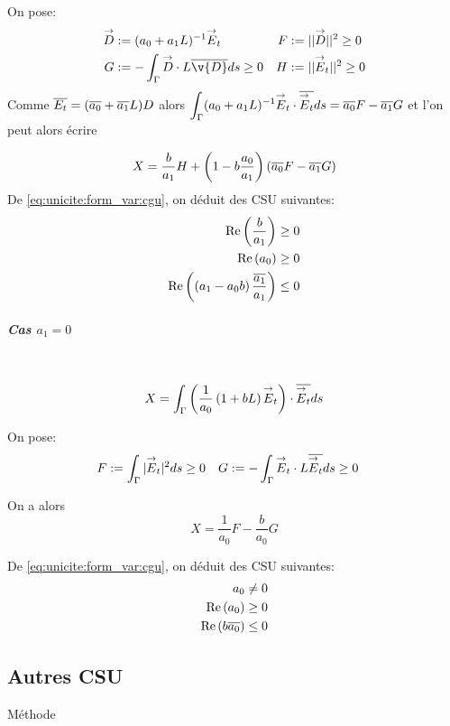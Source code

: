 					On pose:
					\begin{align*}
						\vect D &:= (a_0 + a_1 L)^{-1}\vE_t & F&:= || \vect D || ^2 \ge 0  \\
						G&:= -\int_\Gamma \vect D \cdot L\conj{\v{D}} ds \ge 0 & H &:= || \vE_t || ^2 \ge 0
					\end{align*}
					Comme \({\overline{E_t}} = ({\overline{a_0}} + {\overline{a_1}}L)D\) alors \(\displaystyle\int_\Gamma (a_0 +a_1 L) ^{-1}{\overset{\rightarrow}{E}}_t\cdot {\overline{{\overset{\rightarrow}{E}}_t}} ds = {\overline{a_0}} F - {\overline{a_1}} G\) et l'on peut alors écrire

					\begin{equation}
						\label{eq:unicite:form_var:decomp_cgu_ci1_a1}
						X = \dfrac{b}{a_1}H   + \left(1-b\dfrac{a_0}{a_1}\right)\left({\overline{a_0}} F - {\overline{a_1}} G\right)
					\end{equation}
					De \eqref{eq:unicite:form_var:cgu}, on déduit des CSU suivantes:
					\begin{align}
						\operatorname{Re}\left(\dfrac{b}{a_1}\right) \ge 0 \\
						\operatorname{Re}\left(a_0\right) \ge 0 \\
						\operatorname{Re}\left(\left(a_1-a_0 b\right)\dfrac{{\overline{a_1}}}{a_1}\right) \le 0
					\end{align}

				\subparagraph{Cas \(a_1=0\)}
					~
					\[
						X = \int_\Gamma \left( \dfrac{1}{a_0}\left(1+bL\right){\overset{\rightarrow}{E}}_t\right) \cdot {\overline{{\overset{\rightarrow}{E}}_t}} ds
					\]

					On pose:
					\begin{align*}
						F&:= \int_\Gamma | {\overset{\rightarrow}{E}}_t | ^2 ds \ge 0 & G &:= -\int_\Gamma {\overset{\rightarrow}{E}}_t \cdot L{\overline{{\overset{\rightarrow}{E}}_t}} ds \ge 0
					\end{align*}

					On a alors
					\begin{equation}
						\label{eq:unicite:form_var:decomp_cgu_ci1_a1_nul}
						X = \frac{1}{a_0}F - \frac{b}{a_0}G
					\end{equation}

					De \eqref{eq:unicite:form_var:cgu}, on déduit des CSU suivantes:
					\begin{align}
						a_0 \not= 0\\
						\operatorname{Re}\left(a_0\right) \ge 0\\
						\operatorname{Re}\left(b{\overline{a_0}}\right) \le 0
					\end{align}

	\subsection{Autres CSU}
		Méthode \cite{stupfel_implementation_2015}

